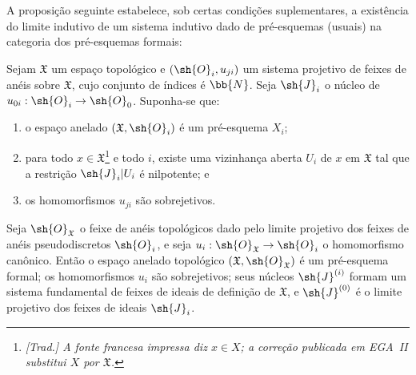 \documentclass[oneside]{amsart}
\makeatletter
\newcommand{\ega@arrow}[2]{\mathchoice{#1}{#2}{#2}{#2}}
\renewcommand{\to}{\ega@arrow{\longrightarrow}{\rightarrow}}
\newcommand{\oldpage}[2][]{{\marginnote{\normalfont\textbf{#1}~|~#2}}\ignorespaces}
\let\EGAOriginalLabel\label
\renewcommand{\label}[1]{\phantomsection\EGAOriginalLabel{#1}}
\makeatother
\begin{document}
A proposição seguinte estabelece, sob certas condições suplementares, a existência do limite indutivo de um sistema indutivo dado de pré-esquemas (usuais) na categoria dos pré-esquemas formais:
\begin{proposition}[10.6.3]
\label{I.10.6.3}
Sejam $\mathfrak{X}$ um espaço topológico e $(\sh{O}_i,u_{ji})$ um sistema projetivo de feixes de anéis sobre $\mathfrak{X}$, cujo conjunto de índices é $\bb{N}$.
Seja $\sh{J}_i$ o núcleo de $u_{0i}:\sh{O}_i\to\sh{O}_0$.
Suponha-se que:
\begin{enumerate}
  \item[\rm{(a)}] o espaço anelado $(\mathfrak{X},\sh{O}_i)$ é um pré-esquema $X_i$;
  \item[\rm{(b)}] para todo $x\in\mathfrak{X}$\footnote{\emph{[Trad.] A fonte francesa impressa diz $x\in X$; a correção publicada em EGA~II substitui $X$ por $\mathfrak{X}$.}} e todo $i$, existe uma vizinhança aberta $U_i$ de $x$ em $\mathfrak{X}$ tal que a restrição $\sh{J}_i|U_i$ é nilpotente; e
  \item[\rm{(c)}] os homomorfismos $u_{ji}$ são sobrejetivos.
\end{enumerate}

\oldpage[I]{190}
Seja $\sh{O}_\mathfrak{X}$ o feixe de anéis topológicos dado pelo limite projetivo dos feixes de anéis pseudodiscretos $\sh{O}_i$, e seja $u_i:\sh{O}_\mathfrak{X}\to\sh{O}_i$ o homomorfismo canônico.
Então o espaço anelado topológico $(\mathfrak{X},\sh{O}_\mathfrak{X})$ é um pré-esquema formal; os homomorfismos $u_i$ são sobrejetivos; seus núcleos $\sh{J}^{(i)}$ formam um sistema fundamental de feixes de ideais de definição de $\mathfrak{X}$, e $\sh{J}^{(0)}$ é o limite projetivo dos feixes de ideais $\sh{J}_i$.
\end{proposition}
\end{document}
